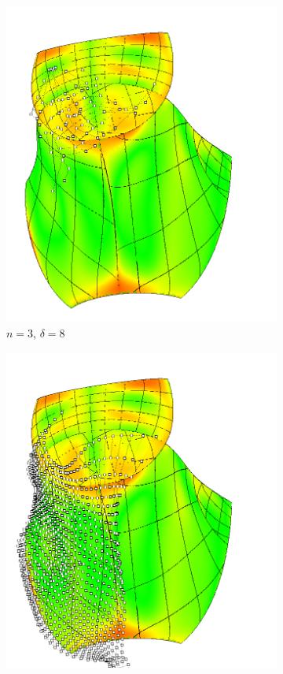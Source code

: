 \documentclass[9pt,academicons]{article}
\begin{document}
\begin{figure}[!ht]
  {
    \hfill
    \begin{subfigure}{.3\textwidth}
      \centering
      \includegraphics[width=.9\textwidth]{images/cagd86/cg3.png}
      \caption{$n=3$, $\delta=8$}
      \label{fig:cagd86-3-cg}
    \end{subfigure}
    \hfill
    \begin{subfigure}{.3\textwidth}
      \centering
      \includegraphics[width=.9\textwidth]{images/cagd86/cg2.png}

\end{subfigure}}
\end{figure}
\end{document}
